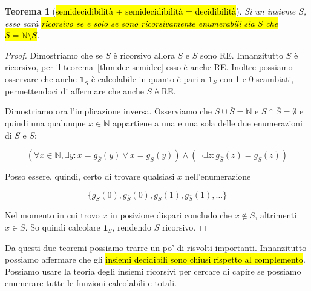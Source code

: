 \documentclass[a4paper,11pt,twoside]{article}
\theoremstyle{plain}
\newtheorem{thm}{Teorema}[section]
\theoremstyle{definition}
\theoremstyle{remark}
\begin{document}
\begin{thm}[\hl{semidecidibilità + semidecidibilità = decidibilità}]\label{thm:0.5+0.5=1}
  Si un insieme $S$, esso sarà \hl{ricorsivo se e solo se sono ricorsivamente
  enumerabili sia $S$ che $\bar{S} = \mathbb{N} \setminus S$}.
\end{thm}
\begin{proof}
  Dimostriamo che se $S$ è ricorsivo allora $S$ e $\bar{S}$ sono RE\@.
  Innanzitutto $S$ è ricorsivo, per il teorema~\ref{thm:dec-semidec} esso è
  anche RE\@. Inoltre possiamo osservare che anche $\mathbf{1}_{\bar{S}}$ è
  calcolabile in quanto è pari a $\mathbf{1}_S$ con 1 e 0 scambiati,
  permettendoci di affermare che anche $\bar{S}$ è RE\@.

  Dimostriamo ora l'implicazione inversa. Osserviamo che $S \cup \bar{S} =
  \mathbb{N}$ e $S \cap \bar{S} = \emptyset$ e quindi una qualunque $x \in
  \mathbb{N}$ appartiene a una e una sola delle due enumerazioni di $S$ e
  $\bar{S}$:

  \[
    (\forall x \in \mathbb{N}, \exists y : x = g_{\bar{S}}(y) \lor x = g_S(y))
      \land (\neg \exists z : g_{\bar{S}}(z) = g_S(z))
  \]

  Posso essere, quindi, certo di trovare qualsiasi $x$ nell'enumerazione

  \[
    \{ g_S(0), g_{\bar{S}}(0), g_S(1), g_{\bar{S}}(1), \ldots \}
  \]

  Nel momento in cui trovo $x$ in posizione dispari concludo che $x \notin S$,
  altrimenti $x \in S$. So quindi calcolare $\mathbf{1}_S$, rendendo $S$
  ricorsivo.
\end{proof}

Da questi due teoremi possiamo trarre un po' di risvolti importanti.
Innanzitutto possiamo affermare che gli \hl{insiemi decidibili sono chiusi
rispetto al complemento}. Possiamo usare la teoria degli insiemi ricorsivi per
cercare di capire se possiamo enumerare tutte le funzioni calcolabili e totali.
\end{document}
